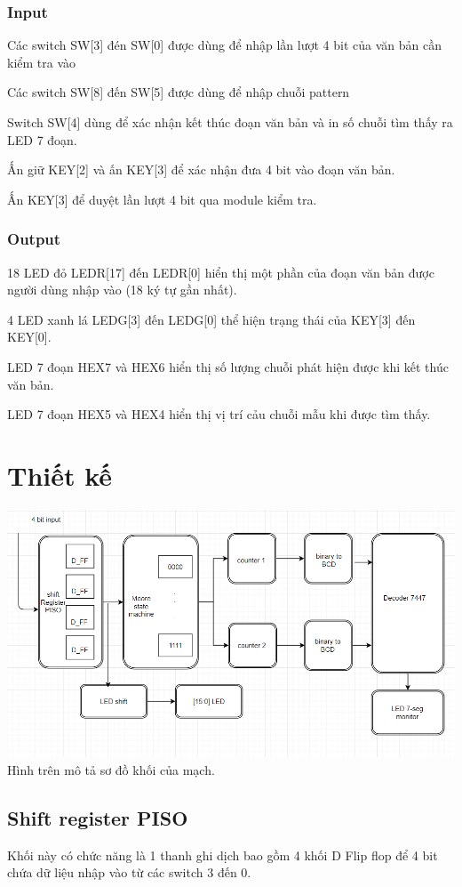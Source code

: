 \documentclass[a4paper]{article}
\begin{document}
\subsubsection{Input}
Các switch SW[3] đén SW[0] được dùng để nhập lần lượt 4 bit của văn bản cần kiểm tra vào

Các switch SW[8] đến SW[5] được dùng để nhập chuỗi pattern

Switch SW[4] dùng để xác nhận kết thúc đoạn văn bản và in số chuỗi tìm thấy ra LED 7 đoạn.

Ấn giữ KEY[2] và ấn KEY[3] để xác nhận đưa 4 bit vào đoạn văn bản.

Ấn KEY[3] để duyệt lần lượt 4 bit qua module kiểm tra.
\subsubsection{Output}
18 LED đỏ LEDR[17] đến LEDR[0] hiển thị một phần của đoạn văn bản được người dùng nhập vào (18 ký tự gần nhất). 

4 LED xanh lá LEDG[3] đến LEDG[0] thể hiện trạng thái của KEY[3] đến KEY[0].

LED 7 đoạn HEX7 và HEX6 hiển thị số lượng chuỗi phát hiện được khi kết thúc văn bản.

LED 7 đoạn HEX5 và HEX4 hiển thị vị trí cảu chuỗi mẫu khi được tìm thấy.
\section{Thiết kế}
\includegraphics[width=15cm]{block_diagram.png}\\
Hình trên mô tả sơ đồ khối của mạch.
	\subsection{Shift register PISO}
	Khối này có chức năng là 1 thanh ghi dịch bao gồm 4 khối D Flip flop để 4 bit chứa dữ liệu nhập vào từ các switch 3 đến 0.\\ 
	
\end{document}
